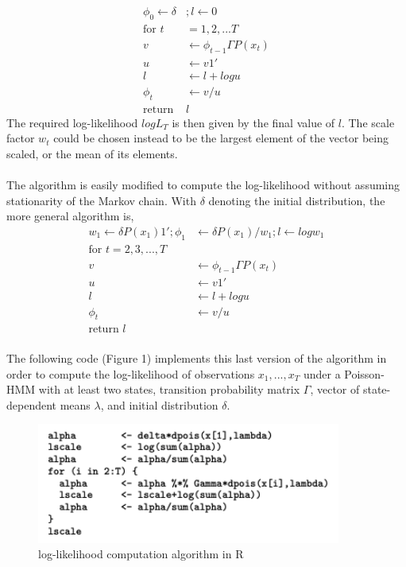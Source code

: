 \documentclass{article}
\begin{document}
\begin{align}
    \phi_0 \leftarrow \delta & ; l \leftarrow 0 \\
    \text{for } t  &= 1, 2, ... T \\
    v & \leftarrow \phi_{t-1} \Gamma P(x_t) \\
    u & \leftarrow v 1' \\
    l & \leftarrow l + log u \\
    \phi_t & \leftarrow v / u \\
    \text{return } & l
\end{align}
The required log-likelihood $log L_T$ is then given by the final value of $l$. The scale factor $w_t$ could be chosen instead to be the largest element of the vector being scaled, or the mean of its elements. \\
\\
The algorithm is easily modified to compute the log-likelihood without assuming stationarity of the Markov chain. With $\delta$ denoting the initial distribution, the more general algorithm is,
\begin{align}
    w_1 \leftarrow \delta P(x_1) 1' ; \phi_1  & \leftarrow \delta P(x_1) / w_1 ; l \leftarrow log w_1 \\
    \text{for } t = 2, 3, ..., T & \\
    v & \leftarrow \phi_{t-1} \Gamma P(x_t) \\
    u & \leftarrow v 1' \\
    l & \leftarrow l + log u \\
    \phi_t & \leftarrow v / u \\
    \text{return } l \text{                        } &
\end{align}
\\
The following code (Figure 1) implements this last version of the algorithm in order to compute the log-likelihood of observations $x_1, ..., x_T$ under a Poisson-HMM with at least two states, transition probability matrix $\Gamma$, vector of state-dependent means $\lambda$, and initial distribution $\delta$. \\
\begin{figure}
    \includegraphics[width = 10cm]{algo.png}
    \caption{log-likelihood computation algorithm in R}
\end{figure}
\end{document}
